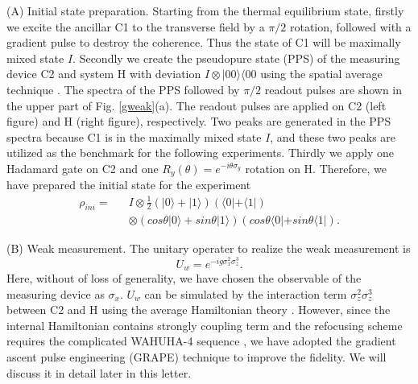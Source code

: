 \documentclass[prl,twocolumn,showpacs]{revtex4}
\begin{document}
 (A) Initial state preparation.  Starting from the thermal equilibrium state, firstly we excite the ancillar C1 to the transverse field by a $\pi/2$ rotation, followed with a gradient pulse to destroy the coherence. Thus the state of C1 will be maximally mixed state $I$. Secondly we create the pseudopure state (PPS) of the measuring device C2 and system H with deviation $I \otimes | 00 \rangle \langle 00$ using the spatial average technique \cite{spatial}. The spectra of the PPS followed by $\pi/2$ readout pulses are shown in the upper part of Fig. \ref{gweak}(a). The readout pulses are applied on C2 (left figure) and H (right figure), respectively. Two peaks are generated in the PPS spectra because C1 is in the maximally mixed state $I$, and these two peaks are utilized as the benchmark for the following experiments. Thirdly we apply one Hadamard gate on C2 and one $R_y(\theta) = e^{-i\theta\sigma_y}$ rotation on H. Therefore, we have prepared the initial state for the experiment
 \begin{eqnarray}\label{pps}
 \rho_{ini}= &&I\otimes \frac{1}{2} (|0\rangle + |1\rangle) (\langle 0 | + \langle 1 |) \nonumber\\
 &&\otimes  (cos\theta|0\rangle + sin\theta|1\rangle)(cos\theta\langle 0 | + sin\theta\langle 1 |).
 \end{eqnarray}

 (B) Weak measurement. The unitary operater to realize the weak measurement is
 \begin{equation}\label{uw}
U_w=e^{-ig\sigma_x^2 \sigma_z^3}.
 \end{equation}
 Here, without of loss of generality, we have chosen the observable of the measuring device as $\sigma_x$. $U_w$ can be simulated by the interaction term $\sigma_z^2\sigma_z^3$ between C2 and H using the average Hamiltonian theory \cite{ernstbook}. However, since the internal Hamiltonian contains strongly coupling term and the refocusing scheme requires the complicated WAHUHA-4 sequence \cite{wahuha}, we have adopted the gradient ascent pulse engineering (GRAPE) technique \cite{grape1,grape2} to improve the fidelity. We will discuss it in detail later in this letter.
\end{document}
